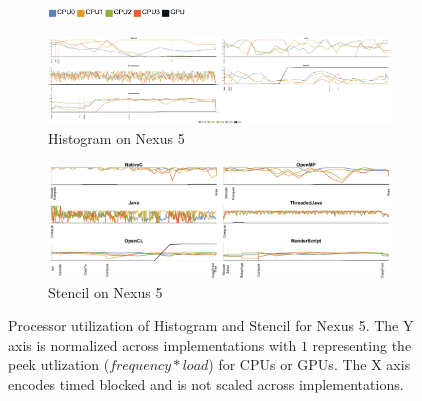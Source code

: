 \FloatBarrier



\begin{figure}[ht]
  \centering

  \begin{subfigure}[b]{\textwidth}
          \centering
          \includegraphics[width=0.4\textwidth]{data/load_legend.pdf}
  \end{subfigure}

  \begin{subfigure}[b]{0.9\textwidth}
      \centering
      \includegraphics[width=\textwidth]{data/load_histogram_nexus5.pdf}
      \caption{Histogram on Nexus 5}
      \label{fig:Histogram5}
  \end{subfigure}
  \begin{subfigure}[b]{0.9\textwidth}
      \centering
      \includegraphics[width=\textwidth]{data/load_stencil_nexus5.pdf}
      \caption{Stencil on Nexus 5}
      \label{fig:Stencil5}
  \end{subfigure}

  \caption{Processor utilization of Histogram and Stencil for Nexus 5. The Y axis is normalized across implementations with $1$ representing the peek utlization ($frequency*load$) for CPUs or GPUs. The X axis encodes timed blocked and is not scaled across implementations.}
\end{figure}
\FloatBarrier
